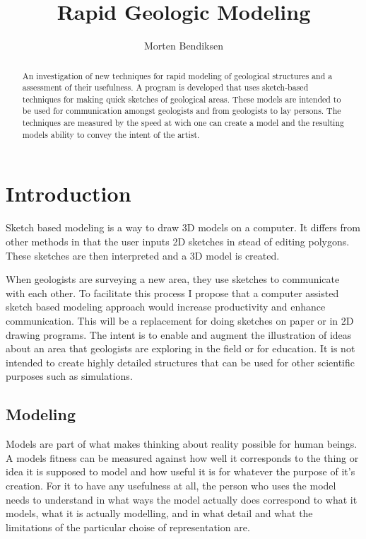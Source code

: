\documentclass[a4paper,10pt]{article}
\title{Rapid Geologic Modeling}
\author{Morten Bendiksen}
\begin{document}
\maketitle

\begin{abstract}
An investigation of new techniques for rapid modeling of geological structures and a assessment of their usefulness. A program is developed that uses sketch-based techniques for making quick sketches of geological areas. These models are intended to be used for communication amongst geologists and from geologists to lay persons. The techniques are measured by the speed at wich one can create a model and the resulting models ability to convey the intent of the artist.
\end{abstract}

\newpage

\tableofcontents 

\newpage

\section{Introduction}
Sketch based modeling is a way to draw 3D models on a computer. It differs from other methods in that the user inputs 2D sketches in stead of editing polygons. These sketches are then interpreted and a 3D model is created.

When geologists are surveying a new area, they use sketches to communicate with each other. To facilitate this process I propose that a computer assisted sketch based modeling approach would increase productivity and enhance communication. This will be a replacement for doing sketches on paper or in 2D drawing programs. The intent is to enable and augment the illustration of ideas about an area that geologists are exploring in the field or for education. It is not intended to create highly detailed structures that can be used for other scientific purposes such as simulations. 

\subsection{Modeling}
Models are part of what makes thinking about reality possible for human beings. A models fitness can be measured against how well it corresponds to the thing or idea it is supposed to model and how useful it is for whatever the purpose of it's creation. For it to have any usefulness at all, the person who uses the model needs to understand in what ways the model actually does correspond to what it models, what it is actually modelling, and in what detail and what the limitations of the particular choise of representation are.
\end{document}
